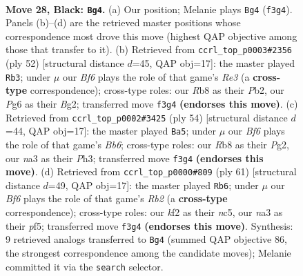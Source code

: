 \documentclass[11pt]{article}
\begin{document}
\clearpage

\begin{figure}[p]\centering
\begin{subfigure}{0.46\textwidth}\centering
\resizebox{\linewidth}{!}{%
\newchessgame
\chessboard[
  setfen={1r6/pp4k1/6pp/2pr4/4pP1P/N3Pb2/PP3K2/1RB5 b - - 1 28},
  showmover=false,
  pgfstyle=straightmove, color=movearrow, markmove={f3-g4}
]}
\caption{}
\end{subfigure}\hfill
\begin{subfigure}{0.46\textwidth}\centering
\resizebox{\linewidth}{!}{%
\newchessgame
\chessboard[
  setfen={r7/p2b1k1p/2p3p1/3n1pB1/8/P3RPP1/1P4BP/6K1 w - - 1 27},
  showmover=false,
  pgfstyle=straightmove, color=movearrow, markmove={e3-b3}
]}
\caption{}
\end{subfigure}
\\[4pt]
\begin{subfigure}{0.46\textwidth}\centering
\resizebox{\linewidth}{!}{%
\newchessgame
\chessboard[
  setfen={6k1/6bp/pBr3p1/4pp2/2p5/2P4P/PP3PP1/3R2K1 w - - 4 28},
  showmover=false,
  pgfstyle=straightmove, color=movearrow, markmove={b6-a5}
]}
\caption{}
\end{subfigure}\hfill
\begin{subfigure}{0.46\textwidth}\centering
\resizebox{\linewidth}{!}{%
\newchessgame
\chessboard[
  setfen={4k3/1rp2ppp/8/p1N1PP2/P1b3Pb/B6P/2P4K/R7 b - - 8 31},
  showmover=false,
  pgfstyle=straightmove, color=movearrow, markmove={b7-b6}
]}
\caption{}
\end{subfigure}
\caption{\textbf{Move 28, Black: \texttt{Bg4}.} (a) Our position; Melanie plays \texttt{Bg4} (\texttt{f3g4}). Panels (b)--(d) are the retrieved master positions whose correspondence most drove this move (highest QAP objective among those that transfer to it). (b) Retrieved from \texttt{ccrl\_top\_p0003\#2356} (ply 52) [structural distance $d$=45, QAP obj=17]: the master played \texttt{Rb3}; under $\mu$ our \emph{Bf6} plays the role of that game's \emph{Re3} (a \textbf{cross-type} correspondence); cross-type roles: our \emph{R}b8 as their \emph{P}b2, our \emph{P}g6 as their \emph{B}g2; transferred move \texttt{f3g4} \textbf{(endorses this move)}. (c) Retrieved from \texttt{ccrl\_top\_p0002\#3425} (ply 54) [structural distance $d$=44, QAP obj=17]: the master played \texttt{Ba5}; under $\mu$ our \emph{Bf6} plays the role of that game's \emph{Bb6}; cross-type roles: our \emph{R}b8 as their \emph{P}g2, our \emph{n}a3 as their \emph{P}h3; transferred move \texttt{f3g4} \textbf{(endorses this move)}. (d) Retrieved from \texttt{ccrl\_top\_p0000\#809} (ply 61) [structural distance $d$=49, QAP obj=17]: the master played \texttt{Rb6}; under $\mu$ our \emph{Bf6} plays the role of that game's \emph{Rb2} (a \textbf{cross-type} correspondence); cross-type roles: our \emph{k}f2 as their \emph{n}c5, our \emph{n}a3 as their \emph{p}f5; transferred move \texttt{f3g4} \textbf{(endorses this move)}. Synthesis: 9 retrieved analogs transferred to \texttt{Bg4} (summed QAP objective 86, the strongest correspondence among the candidate moves); Melanie committed it via the \texttt{search} selector.}
\label{fig:thought-m55}
\end{figure}
\end{document}
